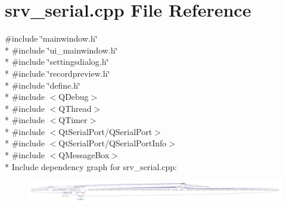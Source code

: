 \hypertarget{a00137}{\section{srv\+\_\+serial.\+cpp File Reference}
\label{a00137}
}
{\ttfamily \#include \char`\"{}mainwindow.\+h\char`\"{}}\\*
{\ttfamily \#include \char`\"{}ui\+\_\+mainwindow.\+h\char`\"{}}\\*
{\ttfamily \#include \char`\"{}settingsdialog.\+h\char`\"{}}\\*
{\ttfamily \#include \char`\"{}recordpreview.\+h\char`\"{}}\\*
{\ttfamily \#include \char`\"{}define.\+h\char`\"{}}\\*
{\ttfamily \#include $<$Q\+Debug$>$}\\*
{\ttfamily \#include $<$Q\+Thread$>$}\\*
{\ttfamily \#include $<$Q\+Timer$>$}\\*
{\ttfamily \#include $<$Qt\+Serial\+Port/\+Q\+Serial\+Port$>$}\\*
{\ttfamily \#include $<$Qt\+Serial\+Port/\+Q\+Serial\+Port\+Info$>$}\\*
{\ttfamily \#include $<$Q\+Message\+Box$>$}\\*
Include dependency graph for srv\+\_\+serial.\+cpp\+:
\nopagebreak
\begin{figure}[H]
\begin{center}
\leavevmode
\includegraphics[width=350pt]{d3/dc9/a00355}
\end{center}
\end{figure}
